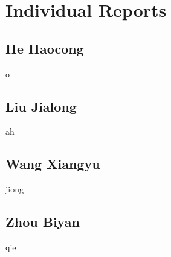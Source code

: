 \documentclass[12pt, a4paper]{article}
\begin{document}
\section{Individual Reports}
\subsection{He Haocong}
o
\subsection{Liu Jialong}
ah
\subsection{Wang Xiangyu}
jiong
\subsection{Zhou Biyan}
qie
\end{document}
